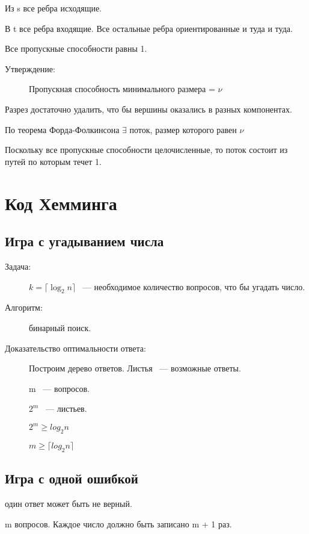 \documentclass[12pt]{article}
\begin{document}
\begin{description}
\begin{description}
Из s все ребра исходящие. 

В t все ребра входящие. Все остальные ребра ориентированные и туда и туда. 

Все пропускные способности равны 1.

\begin{description}
\item[Утверждение:] Пропускная способность минимального размера = $\nu$ 
\end{description}


Разрез достаточно удалить, что бы вершины оказались в разных компонентах. 

По теорема Форда-Фолкинсона $\exists$ поток, размер которого равен $\nu$

Поскольку все пропускные способности целочисленные, то поток состоит из путей по которым течет 1. 
\end{description}

\section{Код Хемминга}
\subsection{Игра с угадыванием числа}

\begin{description}
\item[Задача:] $k = \lceil \log_2 n \rceil$ ~--- необходимое количество вопросов, что бы угадать число.

\item[Алгоритм:] бинарный поиск.

\item[Доказательство оптимальности ответа:]  Построим дерево ответов. Листья ~--- возможные ответы. 

m ~--- вопросов. 

$2^m$ ~--- листьев. 

$2^m \ge log_2 n$

$m \ge \lceil log_2 n \rceil$

\end{description}

\subsection{Игра с одной ошибкой}

\begin{description}
\item [n] один ответ может быть не верный. 
\item m вопросов. Каждое число должно быть записано m + 1 раз. 


\end{description}
\end{description}
\end{document}
